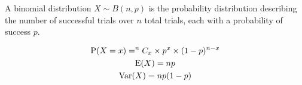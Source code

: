 \documentclass[../main]{subfiles}
\begin{document}
	A binomial distribution \(X\sim B(n,p)\) is the probability distribution describing the number of successful trials over \(n\) total trials, each with a probability of success \(p\).

	\begin{equation*} \begin{gathered}
		\operatorname{P}(X=x) = ^nC_x \times p^x \times (1-p)^{n-x} \\
		\operatorname{E}(X) = n p \\
		\operatorname{Var}(X) = n p (1-p)
	\end{gathered} \end{equation*}
\end{document}
